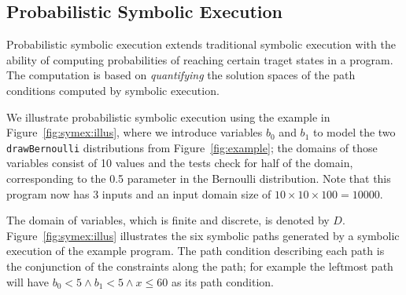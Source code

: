 \subsection{Probabilistic Symbolic Execution}
\label{sec:pse}

Probabilistic symbolic execution extends traditional symbolic execution with the ability of computing probabilities of reaching certain traget states in a program.
The computation is based on {\em quantifying} the solution spaces of the path conditions computed by symbolic execution.



We illustrate probabilistic symbolic execution using the example in Figure~\ref{fig:symex:illus}, where 
we introduce variables $b_0$ and $b_1$ to model 
the two {\tt drawBernoulli} distributions from Figure~\ref{fig:example};
the domains of those variables consist of 10 values and the tests
check for half of the domain, corresponding to the 0.5 parameter
in the Bernoulli distribution.
Note that this program now has 3 inputs and an input domain size of
$10 \times 10 \times 100 = 10000$.
The domain of variables, which is finite and discrete, is denoted by $D$.
Figure~\ref{fig:symex:illus} illustrates the six symbolic paths generated by a symbolic execution of the example program. 
The path condition describing each path is the conjunction of the constraints along the path; for example the leftmost path will have $b_0 < 5 \wedge b_1 < 5 \wedge x \le 60$ as its path condition. 

